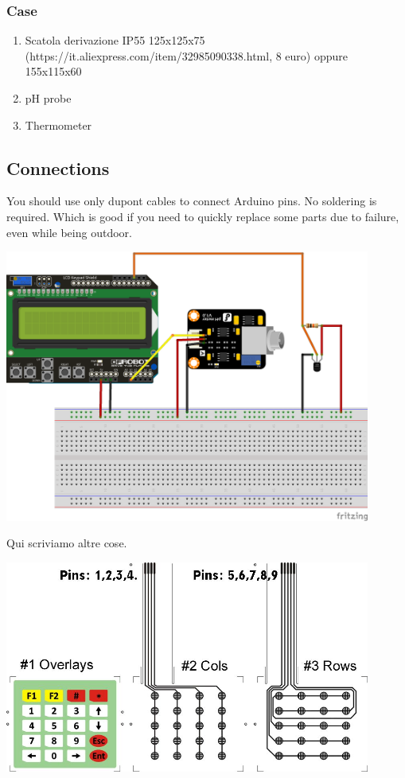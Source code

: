 \documentclass[]{article}
\begin{document}
\subsubsection{Case}
\begin{enumerate}
\item {Scatola derivazione IP55 125x125x75 (https://it.aliexpress.com/item/32985090338.html, 8 euro) oppure 155x115x60}
\item {pH probe}
\item {Thermometer}
\end{enumerate}

\subsection{Connections}

You should use only dupont cables to connect Arduino pins. No soldering is required. Which is good if you need to quickly replace some parts due to failure, even while being outdoor.

{\centering  \includegraphics[width=0.9\textwidth]{foto_conduttimetro/conduttimetro_da_campo_bb.png} \par}

Qui scriviamo altre cose.

{\centering  \includegraphics[width=0.9\textwidth]{foto_conduttimetro/keypad.jpg} \par}
\end{document}

